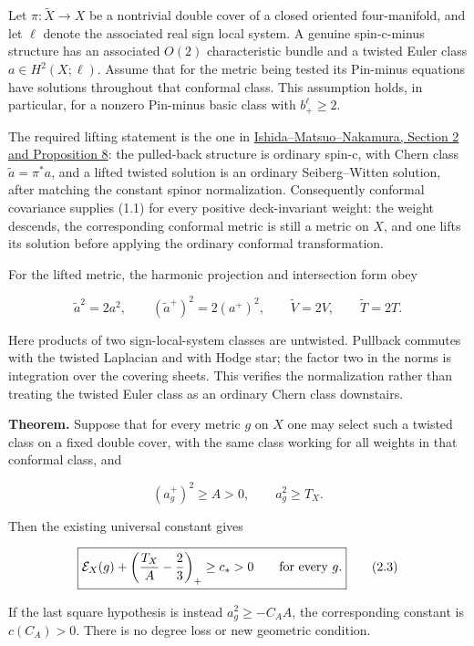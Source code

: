 \documentclass[
  10pt,
]{article}
\begin{document}
Let \(\pi:\widetilde X\to X\) be a nontrivial double cover of a closed
oriented four-manifold, and let \(\ell\) denote the associated real sign
local system. A genuine spin-c-minus structure has an associated
\(O(2)\) characteristic bundle and a twisted Euler class
\(a\in H^2(X;\ell)\). Assume that for the metric being tested its
Pin-minus equations have solutions throughout that conformal class. This
assumption holds, in particular, for a nonzero Pin-minus basic class
with \(b_+^\ell\ge2\).

The required lifting statement is the one in
\href{https://arxiv.org/pdf/1505.05948}{Ishida--Matsuo--Nakamura,
Section 2 and Proposition 8}: the pulled-back structure is ordinary
spin-c, with Chern class \(\widetilde a=\pi^*a\), and a lifted twisted
solution is an ordinary Seiberg--Witten solution, after matching the
constant spinor normalization. Consequently conformal covariance
supplies (1.1) for every positive deck-invariant weight: the weight
descends, the corresponding conformal metric is still a metric on \(X\),
and one lifts its solution before applying the ordinary conformal
transformation.

For the lifted metric, the harmonic projection and intersection form
obey

\[
 \widetilde a^2=2a^2,\qquad
 (\widetilde a^+)^2=2(a^+)^2,\qquad
 \widetilde V=2V,\qquad \widetilde T=2T.                 \tag{2.1}
\]

Here products of two sign-local-system classes are untwisted. Pullback
commutes with the twisted Laplacian and with Hodge star; the factor two
in the norms is integration over the covering sheets. This verifies the
normalization rather than treating the twisted Euler class as an
ordinary Chern class downstairs.

\textbf{Theorem.} Suppose that for every metric \(g\) on \(X\) one may
select such a twisted class on a fixed double cover, with the same class
working for all weights in that conformal class, and

\[
                  (a_g^+)^2\ge A>0,\qquad a_g^2\ge T_X.
                                                               \tag{2.2}
\]

Then the existing universal constant gives

\[
 \boxed{\displaystyle
 \mathcal E_X(g)+\left(\frac{T_X}{A}-\frac23\right)_+
                  \ge c_*>0\qquad\hbox{for every }g.}           \tag{2.3}
\]

If the last square hypothesis is instead \(a_g^2\ge-C_A A\), the
corresponding constant is \(c(C_A)>0\). There is no degree loss or new
geometric condition.
\end{document}
